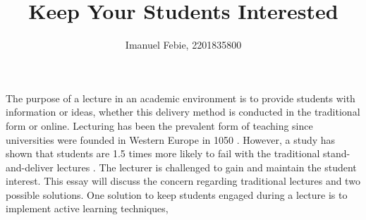 \documentclass[12pt]{article}
\begin{document}
\title{Keep Your Students Interested}
\author{Imanuel Febie, 2201835800}
\maketitle

The purpose of a lecture in an academic environment is to provide students with information or ideas, whether this delivery method is conducted in the traditional form or online. Lecturing has been the prevalent form of teaching since universities were founded in Western Europe in 1050 \cite{bajak2014lectures}. However, a study has shown that students are 1.5 times more likely to fail with the traditional stand-and-deliver lectures \cite{freeman-active-learning-2014}. The lecturer is challenged to gain and maintain the student interest. This essay will discuss the concern regarding traditional lectures and two possible solutions. One solution to keep students engaged during a lecture is to implement active learning techniques,








\end{document}
